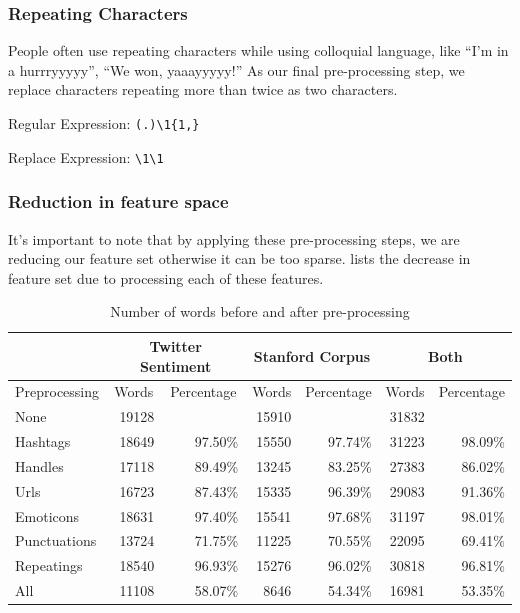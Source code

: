 \subsubsection{Repeating Characters} People often use repeating characters while
using colloquial language, like ``I’m in a hurrryyyyy'', ``We won, yaaayyyyy!''
As our final pre-processing step, we replace characters repeating more than twice
as two characters.

Regular Expression: \verb'(.)\1{1,}'

Replace Expression: \verb'\1\1'

\subsubsection*{Reduction in feature space} It’s important to note that by
applying these pre-processing steps, we are reducing our feature set otherwise
it can be too sparse.  lists the decrease in feature set
due to processing each of these features.

\begin{table}[h!]
\centering

\begin{tabular}{|l|rr|rr|rr|}
\hline
 & \multicolumn{2}{c|}{Twitter Sentiment}
 & \multicolumn{2}{c|}{Stanford Corpus}
 & \multicolumn{2}{c|}{Both} \\\hline
Preprocessing
			& \multicolumn{1}{c}{Words} & \multicolumn{1}{c|}{Percentage}
			& \multicolumn{1}{c}{Words} & \multicolumn{1}{c|}{Percentage}
			& \multicolumn{1}{c}{Words} & \multicolumn{1}{c|}{Percentage} \\\hline
None			& 19128 &         & 15910 &         & 31832 &         \\
Hashtags		& 18649 & 97.50\% & 15550 & 97.74\% & 31223 & 98.09\% \\
Handles			& 17118 & 89.49\% & 13245 & 83.25\% & 27383 & 86.02\% \\
Urls			& 16723 & 87.43\% & 15335 & 96.39\% & 29083 & 91.36\% \\
Emoticons		& 18631 & 97.40\% & 15541 & 97.68\% & 31197 & 98.01\% \\
Punctuations	& 13724 & 71.75\% & 11225 & 70.55\% & 22095 & 69.41\% \\
Repeatings		& 18540 & 96.93\% & 15276 & 96.02\% & 30818 & 96.81\% \\\hline
All				& 11108 & 58.07\% &  8646 & 54.34\% & 16981 & 53.35\% \\
\hline
\end{tabular}

\caption{Number of words before and after pre-processing}
\label{tab:reduction}
\end{table}
